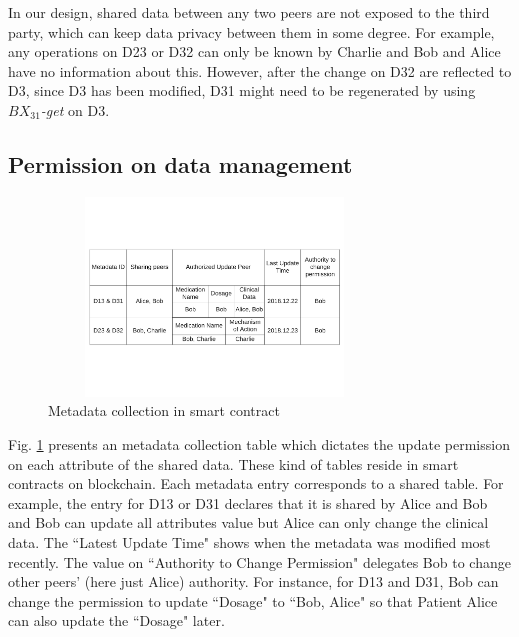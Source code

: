 \documentclass[conference]{IEEEtran}
\begin{document}
In our design, shared data between any two peers are not exposed to the third party, which can keep data privacy between them in some degree. For example, any operations on D23 or D32 can only be known by Charlie and Bob and Alice have no information about this. However, after the change on D32 are reflected to D3, since D3 has been modified, D31 might need to be regenerated by using \emph{$BX_{31}$-get} on D3.


%
%
%

\subsection{Permission on data management}

\begin{figure}[htbp]
	\centerline{\includegraphics[width=250pt,height=150pt]{metadata.pdf}}
	\caption{Metadata collection in smart contract}
	\label{metadata}
\end{figure}

Fig. \ref{metadata} presents an metadata collection table which dictates the update permission on each attribute of the shared data. These kind of tables reside in smart contracts on blockchain. Each metadata entry corresponds to a shared table. For example, the entry for D13 or D31 declares that it is shared by Alice and Bob and Bob can update all attributes value but Alice can only change the clinical data. The ``Latest Update Time" shows when the metadata was modified most recently. The value on ``Authority to Change Permission"  delegates Bob to change other peers' (here just Alice) authority. For instance, for D13 and D31, Bob can change the permission to update ``Dosage" to ``Bob, Alice" so that Patient Alice can also update the  ``Dosage" later.
\end{document}

